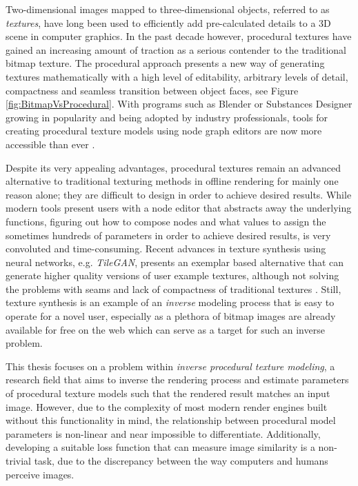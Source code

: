 Two-dimensional images mapped to three-dimensional objects, referred to as \textit{textures}, have long been used to efficiently add pre-calculated details to a 3D scene in computer graphics. In the past decade however, procedural textures have gained an increasing amount of traction as a serious contender to the traditional bitmap texture. The procedural approach presents a new way of generating textures mathematically with a high level of editability, arbitrary levels of detail, compactness and seamless transition between object faces, see Figure \ref{fig:BitmapVsProcedural}. With programs such as Blender or Substances Designer growing in popularity and being adopted by industry professionals, tools for creating procedural texture models using node graph editors are now more accessible than ever \cite{blenderfoundation_2020_blenderorg, a2020_substance}. 

Despite its very appealing advantages, procedural textures remain an advanced alternative to traditional texturing methods in offline rendering for mainly one reason alone; they are difficult to design in order to achieve desired results. While modern tools present users with a node editor that abstracts away the underlying functions, figuring out how to compose nodes and what values to assign the sometimes hundreds of parameters in order to achieve desired results, is very convoluted and time-consuming. Recent advances in texture synthesis using neural networks, e.g. \textit{TileGAN}, presents an exemplar based alternative that can generate higher quality versions of user example textures, although not solving the problems with seams and lack of compactness of traditional textures \cite{frhstck_2019_tilegan}. Still, texture synthesis is an example of an \textit{inverse} modeling process that is easy to operate for a novel user, especially as a plethora of bitmap images are already available for free on the web which can serve as a target for such an inverse problem. 

This thesis focuses on a problem within \textit{inverse procedural texture modeling}, a research field that aims to inverse the rendering process and estimate parameters of procedural texture models such that the rendered result matches an input image. However, due to the complexity of most modern render engines built without this functionality in mind, the relationship between procedural model parameters is non-linear and near impossible to differentiate. Additionally, developing a suitable loss function that can measure image similarity is a non-trivial task, due to the discrepancy between the way computers and humans perceive images.


